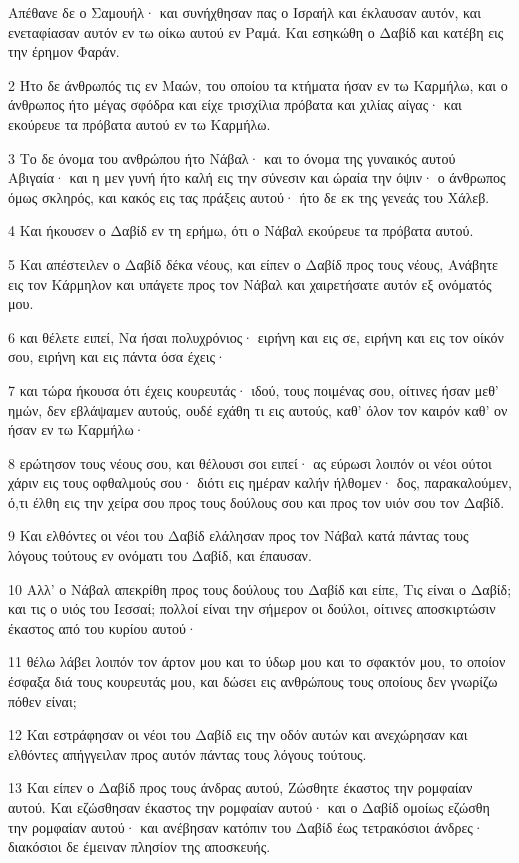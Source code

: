\par Απέθανε δε ο Σαμουήλ· και συνήχθησαν πας ο Ισραήλ και έκλαυσαν αυτόν, και ενεταφίασαν αυτόν εν τω οίκω αυτού εν Ραμά. Και εσηκώθη ο Δαβίδ και κατέβη εις την έρημον Φαράν.
\par 2 Ήτο δε άνθρωπός τις εν Μαών, του οποίου τα κτήματα ήσαν εν τω Καρμήλω, και ο άνθρωπος ήτο μέγας σφόδρα και είχε τρισχίλια πρόβατα και χιλίας αίγας· και εκούρευε τα πρόβατα αυτού εν τω Καρμήλω.
\par 3 Το δε όνομα του ανθρώπου ήτο Νάβαλ· και το όνομα της γυναικός αυτού Αβιγαία· και η μεν γυνή ήτο καλή εις την σύνεσιν και ώραία την όψιν· ο άνθρωπος όμως σκληρός, και κακός εις τας πράξεις αυτού· ήτο δε εκ της γενεάς του Χάλεβ.
\par 4 Και ήκουσεν ο Δαβίδ εν τη ερήμω, ότι ο Νάβαλ εκούρευε τα πρόβατα αυτού.
\par 5 Και απέστειλεν ο Δαβίδ δέκα νέους, και είπεν ο Δαβίδ προς τους νέους, Ανάβητε εις τον Κάρμηλον και υπάγετε προς τον Νάβαλ και χαιρετήσατε αυτόν εξ ονόματός μου.
\par 6 και θέλετε ειπεί, Να ήσαι πολυχρόνιος· ειρήνη και εις σε, ειρήνη και εις τον οίκόν σου, ειρήνη και εις πάντα όσα έχεις·
\par 7 και τώρα ήκουσα ότι έχεις κουρευτάς· ιδού, τους ποιμένας σου, οίτινες ήσαν μεθ' ημών, δεν εβλάψαμεν αυτούς, ουδέ εχάθη τι εις αυτούς, καθ' όλον τον καιρόν καθ' ον ήσαν εν τω Καρμήλω·
\par 8 ερώτησον τους νέους σου, και θέλουσι σοι ειπεί· ας εύρωσι λοιπόν οι νέοι ούτοι χάριν εις τους οφθαλμούς σου· διότι εις ημέραν καλήν ήλθομεν· δος, παρακαλούμεν, ό,τι έλθη εις την χείρα σου προς τους δούλους σου και προς τον υιόν σου τον Δαβίδ.
\par 9 Και ελθόντες οι νέοι του Δαβίδ ελάλησαν προς τον Νάβαλ κατά πάντας τους λόγους τούτους εν ονόματι του Δαβίδ, και έπαυσαν.
\par 10 Αλλ' ο Νάβαλ απεκρίθη προς τους δούλους του Δαβίδ και είπε, Τις είναι ο Δαβίδ; και τις ο υιός του Ιεσσαί; πολλοί είναι την σήμερον οι δούλοι, οίτινες αποσκιρτώσιν έκαστος από του κυρίου αυτού·
\par 11 θέλω λάβει λοιπόν τον άρτον μου και το ύδωρ μου και το σφακτόν μου, το οποίον έσφαξα διά τους κουρευτάς μου, και δώσει εις ανθρώπους τους οποίους δεν γνωρίζω πόθεν είναι;
\par 12 Και εστράφησαν οι νέοι του Δαβίδ εις την οδόν αυτών και ανεχώρησαν και ελθόντες απήγγειλαν προς αυτόν πάντας τους λόγους τούτους.
\par 13 Και είπεν ο Δαβίδ προς τους άνδρας αυτού, Ζώσθητε έκαστος την ρομφαίαν αυτού. Και εζώσθησαν έκαστος την ρομφαίαν αυτού· και ο Δαβίδ ομοίως εζώσθη την ρομφαίαν αυτού· και ανέβησαν κατόπιν του Δαβίδ έως τετρακόσιοι άνδρες· διακόσιοι δε έμειναν πλησίον της αποσκευής.
